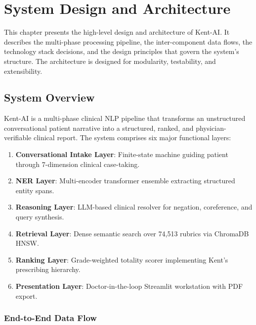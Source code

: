 
\chapter{System Design and Architecture}
\label{Chapter3}

This chapter presents the high-level design and architecture of Kent-AI. It describes the multi-phase processing pipeline, the inter-component data flows, the technology stack decisions, and the design principles that govern the system's structure. The architecture is designed for modularity, testability, and extensibility.


\section{System Overview}

Kent-AI is a multi-phase clinical NLP pipeline that transforms an unstructured conversational patient narrative into a structured, ranked, and physician-verifiable clinical report. The system comprises six major functional layers:

\begin{enumerate}
  \item \textbf{Conversational Intake Layer}: Finite-state machine guiding patient through 7-dimension clinical case-taking.
  \item \textbf{NER Layer}: Multi-encoder transformer ensemble extracting structured entity spans.
  \item \textbf{Reasoning Layer}: LLM-based clinical resolver for negation, coreference, and query synthesis.
  \item \textbf{Retrieval Layer}: Dense semantic search over 74,513 rubrics via ChromaDB HNSW.
  \item \textbf{Ranking Layer}: Grade-weighted totality scorer implementing Kent's prescribing hierarchy.
  \item \textbf{Presentation Layer}: Doctor-in-the-loop Streamlit workstation with PDF export.
\end{enumerate}

\subsection{End-to-End Data Flow}


